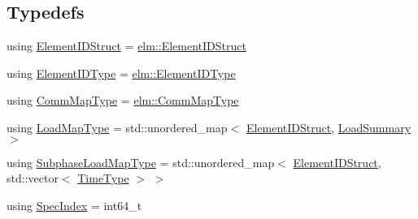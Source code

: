 \subsection*{Typedefs}
\begin{DoxyCompactItemize}
\item 
using \hyperlink{namespacevt_1_1vrt_1_1collection_1_1balance_a9f5b53fafb270212279a4757d2c4cd28}{Element\+I\+D\+Struct} = \hyperlink{structvt_1_1elm_1_1_element_i_d_struct}{elm\+::\+Element\+I\+D\+Struct}
\item 
using \hyperlink{namespacevt_1_1vrt_1_1collection_1_1balance_a592736f733df4f90856df90a1fd08905}{Element\+I\+D\+Type} = \hyperlink{namespacevt_1_1elm_a63afb64985b41b7b6dcf2f01336391f8}{elm\+::\+Element\+I\+D\+Type}
\item 
using \hyperlink{namespacevt_1_1vrt_1_1collection_1_1balance_a01ee1fb0ae2da1d2ab7fdca3be9ae351}{Comm\+Map\+Type} = \hyperlink{namespacevt_1_1elm_a38487cb8896b9b4763efa9022fab560e}{elm\+::\+Comm\+Map\+Type}
\item 
using \hyperlink{namespacevt_1_1vrt_1_1collection_1_1balance_a5339303db2e1ce964d783a53fd74e6b1}{Load\+Map\+Type} = std\+::unordered\+\_\+map$<$ \hyperlink{namespacevt_1_1vrt_1_1collection_1_1balance_a9f5b53fafb270212279a4757d2c4cd28}{Element\+I\+D\+Struct}, \hyperlink{structvt_1_1vrt_1_1collection_1_1balance_1_1_load_summary}{Load\+Summary} $>$
\item 
using \hyperlink{namespacevt_1_1vrt_1_1collection_1_1balance_a8bdadb2583f128dd256e7d5a10826542}{Subphase\+Load\+Map\+Type} = std\+::unordered\+\_\+map$<$ \hyperlink{namespacevt_1_1vrt_1_1collection_1_1balance_a9f5b53fafb270212279a4757d2c4cd28}{Element\+I\+D\+Struct}, std\+::vector$<$ \hyperlink{namespacevt_a876a9d0cd5a952859c72de8a46881442}{Time\+Type} $>$ $>$
\item 
using \hyperlink{namespacevt_1_1vrt_1_1collection_1_1balance_a72a5e0d9936ddf57f8e6c64e0e9fd123}{Spec\+Index} = int64\+\_\+t
\end{DoxyCompactItemize}
